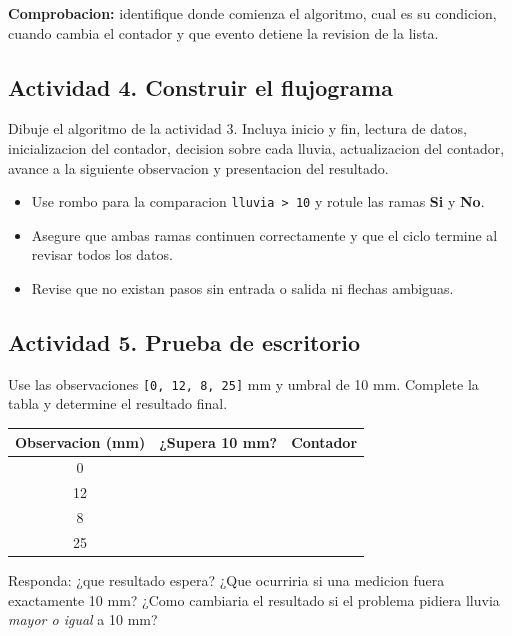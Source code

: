 \documentclass[11pt,a4paper]{article}
\newcommand{\code}[1]{\texttt{#1}}
\begin{document}
\textbf{Comprobacion:} identifique donde comienza el algoritmo, cual es su condicion, cuando cambia el contador y que evento detiene la revision de la lista.

\subsection{Actividad 4. Construir el flujograma}
Dibuje el algoritmo de la actividad 3. Incluya inicio y fin, lectura de datos, inicializacion del contador, decision sobre cada lluvia, actualizacion del contador, avance a la siguiente observacion y presentacion del resultado.
\begin{itemize}
  \item Use rombo para la comparacion \code{lluvia > 10} y rotule las ramas \textbf{Si} y \textbf{No}.
  \item Asegure que ambas ramas continuen correctamente y que el ciclo termine al revisar todos los datos.
  \item Revise que no existan pasos sin entrada o salida ni flechas ambiguas.
\end{itemize}

\subsection{Actividad 5. Prueba de escritorio}
Use las observaciones \code{[0, 12, 8, 25]} mm y umbral de 10 mm. Complete la tabla y determine el resultado final.
\begin{center}
\renewcommand{\arraystretch}{1.5}
\begin{tabularx}{0.85\textwidth}{c c c}
\toprule
Observacion (mm) & ¿Supera 10 mm? & Contador \\
\midrule
0 & & \\
12 & & \\
8 & & \\
25 & & \\
\bottomrule
\end{tabularx}
\end{center}
Responda: ¿que resultado espera? ¿Que ocurriria si una medicion fuera exactamente 10 mm? ¿Como cambiaria el resultado si el problema pidiera lluvia \emph{mayor o igual} a 10 mm?
\end{document}
